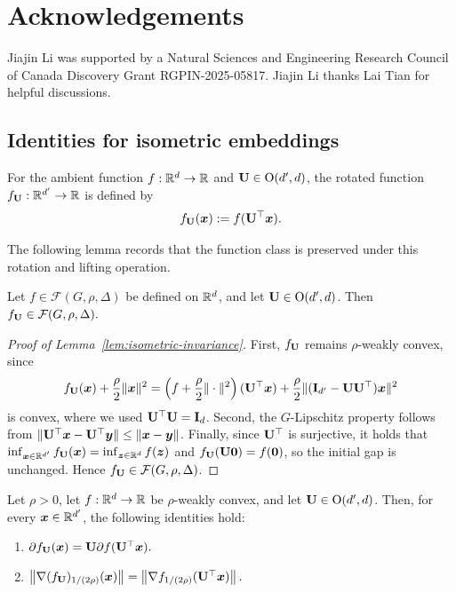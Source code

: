 \section*{Acknowledgements}
Jiajin Li was supported by a Natural Sciences and Engineering Research Council of
Canada Discovery Grant RGPIN-2025-05817. Jiajin Li thanks Lai Tian for helpful discussions.
\begingroup
\raggedright


\endgroup





\begin{appendix}
\section{Identities for isometric embeddings}
\label{app:isometry}

For the ambient function \(f:{\mathbb{R}}^d\to{\mathbb{R}}\) and \({\mathbf{U}}\in\operatorname O(d',d)\), the rotated function $f_{\mathbf{U}}:{\mathbb{R}}^{d'}\to{\mathbb{R}}$ is defined by  
\[
 f_{{\mathbf{U}}}(\bm{x}):=f({\mathbf{U}}^\top\bm{x}).
\]

The following lemma records that the function class is preserved under this rotation and lifting operation.

\begin{lemma}
\label{lem:isometric-invariance}
 Let $f\in\mathcal F(G,\rho,\Delta)$ be defined on ${\mathbb{R}}^d$, and let ${\mathbf{U}}\in\operatorname O(d',d)$. Then $f_{{\mathbf{U}}}\in\mathcal F(G,\rho,\Delta).$
\end{lemma}

\begin{proof}[Proof of Lemma~\ref{lem:isometric-invariance}]
First, \(f_{{\mathbf{U}}}\) remains \(\rho\)-weakly convex, since
\[
f_{{\mathbf{U}}}(\bm{x})+\frac{\rho}{2}\|\bm{x}\|^2
=
\left(f+\frac{\rho}{2}\|\cdot\|^2\right)({\mathbf{U}}^\top\bm{x})
+\frac{\rho}{2}\|({\mathbf{I}}_{d'}-{\mathbf{U}}{\mathbf{U}}^\top)\bm{x}\|^2
\]
is convex, where we used \({\mathbf{U}}^\top{\mathbf{U}}={\mathbf{I}}_d\). Second, the
\(G\)-Lipschitz property follows from
\(\|{\mathbf{U}}^\top\bm{x}-{\mathbf{U}}^\top\bm{y}\|\leq\|\bm{x}-\bm{y}\|\).
Finally, since \({\mathbf{U}}^\top\) is surjective, it holds that $\inf_{\bm{x}\in{\mathbb{R}}^{d'}}f_{{\mathbf{U}}}(\bm{x})=\inf_{\bm{z}\in{\mathbb{R}}^d}f(\bm{z})$ and $f_{{\mathbf{U}}}({\mathbf{U}}{\mathbf 0})=f({\mathbf 0})$,
so the initial gap is unchanged. Hence
\(f_{{\mathbf{U}}}\in\mathcal F(G,\rho,\Delta)\).
\end{proof}

\begin{lemma}
\label{lem:isometric-identities}
Let \(\rho>0\), let \(f:{\mathbb{R}}^d\to{\mathbb{R}}\) be \(\rho\)-weakly convex, and let
\({\mathbf{U}}\in\operatorname O(d',d)\). Then, for every \(\bm{x}\in{\mathbb{R}}^{d'}\),
the following identities hold:
\begin{enumerate}[label=(\roman*)]
    \item $\partial f_{{\mathbf{U}}}(\bm{x})
    =
    {\mathbf{U}}\partial f({\mathbf{U}}^\top\bm{x}).$
    \item $\left\|\nabla(f_{{\mathbf{U}}})_{1/(2\rho)}(\bm{x})\right\|
    =
    \left\|\nabla f_{1/(2\rho)}({\mathbf{U}}^\top\bm{x})\right\|.$
\end{enumerate}
\end{lemma}



\end{appendix}
